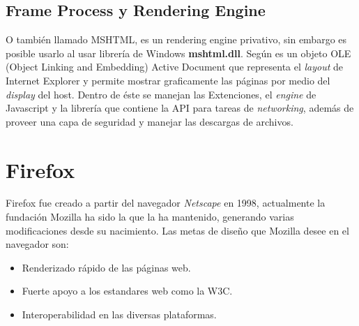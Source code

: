     \subsection{Frame Process y Rendering Engine}   
        \label{chap2:Trident}
        O también llamado MSHTML, es un rendering engine privativo, sin embargo es posible usarlo al usar librería de Windows \textbf{mshtml.dll}. Según \cite{Crowley2010} es un objeto OLE (Object Linking and Embedding) Active Document que representa el \textit{layout} de Internet Explorer y permite mostrar graficamente las páginas por medio del \textit{display} del host. Dentro de éste se manejan las Extenciones, el \textit{engine} de Javascript y la librería que contiene la API para tareas de \textit{networking}, además de proveer una capa de seguridad y manejar las descargas de archivos.




\section{Firefox}
    \label{chap3:Firefox}

    Firefox fue creado a partir del navegador \textit{Netscape} en 1998, actualmente la fundación Mozilla ha sido la que la ha mantenido, generando varias modificaciones desde su nacimiento. Las metas de diseño que Mozilla desee en el navegador son:
    \begin{itemize}
        \item Renderizado rápido de las páginas web.
        \item Fuerte apoyo a los estandares web como la W3C.
        \item Interoperabilidad en las diversas plataformas.
    \end{itemize}

